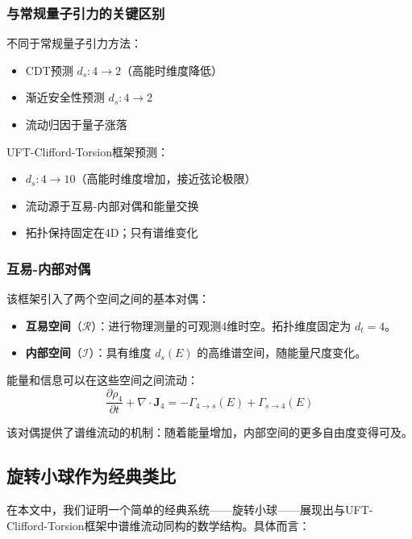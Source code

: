 \documentclass[12pt,a4paper]{article}
\begin{document}
\subsubsection{与常规量子引力的关键区别}

不同于常规量子引力方法：
\begin{itemize}
    \item CDT预测 $d_s: 4 \to 2$（高能时维度降低）
    \item 渐近安全性预测 $d_s: 4 \to 2$
    \item 流动归因于量子涨落
\end{itemize}

UFT-Clifford-Torsion框架预测：
\begin{itemize}
    \item $d_s: 4 \to 10$（高能时维度增加，接近弦论极限）
    \item 流动源于互易-内部对偶和能量交换
    \item 拓扑保持固定在4D；只有谱维变化
\end{itemize}

\subsubsection{互易-内部对偶}

该框架引入了两个空间之间的基本对偶：
\begin{itemize}
    \item \textbf{互易空间}（$\mathcal{R}$）：进行物理测量的可观测4维时空。拓扑维度固定为 $d_t = 4$。
    \item \textbf{内部空间}（$\mathcal{I}$）：具有维度 $d_s(E)$ 的高维谱空间，随能量尺度变化。
\end{itemize}

能量和信息可以在这些空间之间流动：
\begin{equation}
    \frac{\partial \rho_4}{\partial t} + \nabla \cdot \mathbf{J}_4 = -\Gamma_{4 \to s}(E) + \Gamma_{s \to 4}(E)
\end{equation}

该对偶提供了谱维流动的机制：随着能量增加，内部空间的更多自由度变得可及。

\subsection{旋转小球作为经典类比}

在本文中，我们证明一个简单的经典系统——旋转小球——展现出与UFT-Clifford-Torsion框架中谱维流动同构的数学结构。具体而言：
\end{document}

